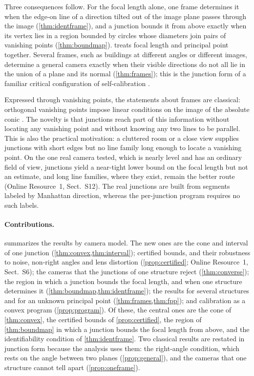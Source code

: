 \documentclass[pdflatex,sn-mathphys-num,iicol]{sn-jnl}
\newcommand{\OR}{Online Resource~1}
\theoremstyle{thmstyleone}
\theoremstyle{thmstylethree}
\theoremstyle{thmstyletwo}
\begin{document}
Three consequences follow. For the focal length alone, one frame determines it when the edge-on line of a direction tilted out of the image plane passes through the image (\cref{thm:identframe}), and a junction bounds it from above exactly when its vertex lies in a region bounded by circles whose diameters join pairs of vanishing points (\cref{thm:boundmap}).  treats focal length and principal point together. Several frames, such as buildings at different angles or different images, determine a general camera exactly when their visible directions do not all lie in the union of a plane and its normal (\cref{thm:frames}); this is the junction form of a familiar critical configuration of self-calibration \citep{hartley1997,sturm1997,deagapito2001,kahl2000}.

Expressed through vanishing points, the statements about frames are classical: orthogonal vanishing points impose linear conditions on the image of the absolute conic \citep{hartley2004,liebowitz1999}. The novelty is that junctions reach part of this information without locating any vanishing point and without knowing any two lines to be parallel. This is also the practical motivation: a cluttered room or a close view supplies junctions with short edges but no line family long enough to locate a vanishing point. On the one real camera tested, which is nearly level and has an ordinary field of view, junctions yield a near-tight lower bound on the focal length but not an estimate, and long line families, where they exist, remain the better route (\OR, Sect.~S12). The real junctions are built from segments labeled by Manhattan direction, whereas the per-junction program requires no such labels.

\paragraph{Contributions.}  summarizes the results by camera model. The new ones are the cone and interval of one junction (\cref{thm:convex,thm:interval}); certified bounds, and their robustness to noise, non-right angles and lens distortion (\cref{prop:certified}; \OR, Sect.~S6); the cameras that the junctions of one structure reject (\cref{thm:converse}); the region in which a junction bounds the focal length, and when one structure determines it (\cref{thm:boundmap,thm:identframe}); the results for several structures and for an unknown principal point (\cref{thm:frames,thm:fpp}); and calibration as a convex program (\cref{prop:program}). Of these, the central ones are the cone of \cref{thm:convex}, the certified bounds of \cref{prop:certified}, the region of \cref{thm:boundmap} in which a junction bounds the focal length from above, and the identifiability condition of \cref{thm:identframe}. Two classical results are restated in junction form because the analysis uses them: the right-angle condition, which rests on the angle between two planes \citep{hartley2004} (\cref{prop:general}), and the cameras that one structure cannot tell apart (\cref{prop:oneframe}).
\end{document}
